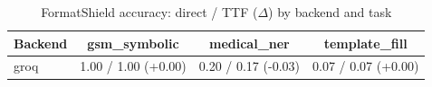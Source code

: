 \begin{table}[h]
  \centering
  \caption{FormatShield accuracy: direct / TTF ($\Delta$) by backend and task}
  \label{tab:accuracy_by_backend}
  \begin{tabular}{lccc}
    \toprule
    \textbf{Backend} & \textbf{gsm\_symbolic} & \textbf{medical\_ner} & \textbf{template\_fill} \\
    \midrule
    groq & 1.00 / 1.00 (+0.00) & 0.20 / 0.17 (-0.03) & 0.07 / 0.07 (+0.00) \\
    \bottomrule
  \end{tabular}
\end{table}